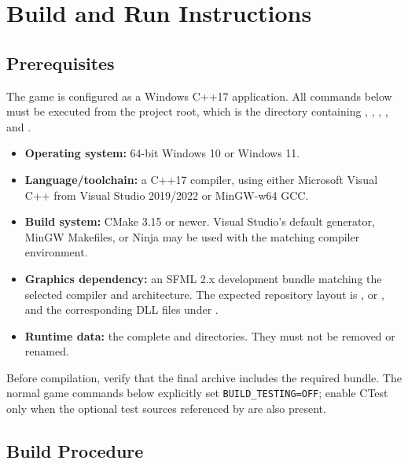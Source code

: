 \documentclass{template}
\begin{document}
\clearpage
\appendix

\section{Build and Run Instructions}

\subsection{Prerequisites}

The game is configured as a Windows C++17 application. All commands below must
be executed from the project root, which is the directory containing
, , , , and
.

\begin{itemize}
    \item \textbf{Operating system:} 64-bit Windows 10 or Windows 11.
    \item \textbf{Language/toolchain:} a C++17 compiler, using either Microsoft
          Visual C++ from Visual Studio 2019/2022 or MinGW-w64 GCC.
    \item \textbf{Build system:} CMake 3.15 or newer. Visual Studio's default
          generator, MinGW Makefiles, or Ninja may be used with the matching
          compiler environment.
    \item \textbf{Graphics dependency:} an SFML 2.x development bundle matching
          the selected compiler and architecture. The expected repository
          layout is ,  or
          , and the corresponding DLL files under
          .
    \item \textbf{Runtime data:} the complete  and 
          directories. They must not be removed or renamed.
\end{itemize}

Before compilation, verify that the final archive includes the required
 bundle. The normal game commands below explicitly set
\texttt{BUILD\_TESTING=OFF}; enable CTest only when the optional test sources
referenced by  are also present.

\subsection{Build Procedure}
\end{document}
